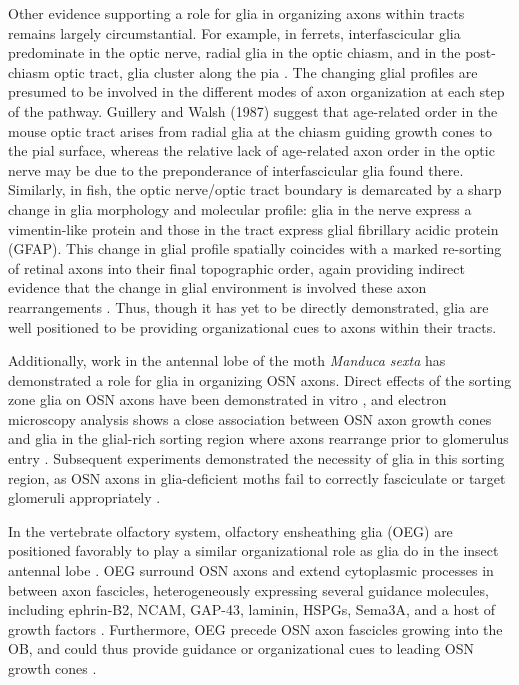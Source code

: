Other evidence supporting a role for glia in organizing axons within tracts remains largely circumstantial. 
For example, in ferrets, interfascicular glia predominate in the optic nerve, radial glia in the optic chiasm, and in the post-chiasm optic tract, glia cluster along the pia \cite{colello1992observations,guillery1987changing}. 
The changing glial profiles are presumed to be involved in the different modes of axon organization at each step of the pathway. 
Guillery and Walsh (1987) suggest that age-related order in the mouse optic tract arises from radial glia at the chiasm guiding growth cones to the pial surface, whereas the relative lack of age-related axon order in the optic nerve may be due to the preponderance of interfascicular glia found there. 
Similarly, in fish, the optic nerve/optic tract boundary is demarcated by a sharp change in glia morphology and molecular profile: glia in the nerve express a vimentin-like protein and those in the tract express glial fibrillary acidic protein (GFAP).
This change in glial profile spatially coincides with a marked re-sorting of retinal axons into their final topographic order, again providing indirect evidence that the change in glial environment is involved these axon rearrangements \cite{maggs1986glial}.
Thus, though it has yet to be directly demonstrated, glia are well positioned to be providing organizational cues to axons within their tracts.

Additionally, work in the antennal lobe of the moth \emph{Manduca sexta} has demonstrated a role for glia in organizing OSN axons.
Direct effects of the sorting zone glia on OSN axons have been demonstrated in vitro \cite{tucker2004vitro}, and electron microscopy analysis shows a close association between OSN axon growth cones and glia in the glial-rich sorting region where axons rearrange prior to glomerulus entry \cite{oland1998targeted}.
Subsequent experiments demonstrated the necessity of glia in this sorting region, as OSN axons in glia-deficient moths fail to correctly fasciculate or target glomeruli appropriately \cite{rossler1999development}. 

In the vertebrate olfactory system, olfactory ensheathing glia (OEG) are positioned favorably to play a similar organizational role as glia do in the insect antennal lobe \cite[reviewed in][]{tolbert2004bidirectional}.
OEG surround OSN axons and extend cytoplasmic processes in between axon fascicles, heterogeneously expressing several guidance molecules, including ephrin-B2, NCAM, GAP-43, laminin, HSPGs, Sema3A, and a host of growth factors \cite[reviewed in][]{chuah2002cellular}.
Furthermore, OEG precede OSN axon fascicles growing into the OB, and could thus provide guidance or organizational cues to leading OSN growth cones \cite{chuah2002cellular,tolbert2004bidirectional}.

